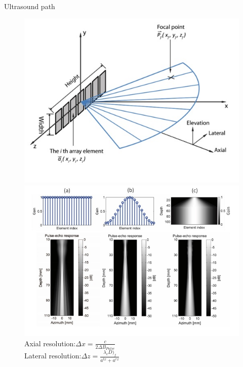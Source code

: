 \documentclass[t,12pt,english
\ifx\beamermode\undefined\else,\beamermode\fi
]{beamer}
\begin{document}
\begin{frame}{Ultrasound path}

\begin{figure}[!htb]
\includegraphics[width=.7\textwidth]{19.jpg}\\
\includegraphics[width=.7\textwidth]{22.jpg}\\
\tiny Axial resolution:$\Delta x=\frac{c}{2\Delta B_{Pulse}}$\\
\tiny Lateral resolution:$\Delta z=\frac{\lambda_{c}D)_{f}}{a^{tx}+a^{rx}}$
\endminipage
{}
\centering


\end{figure}
\end{frame}
\end{document}
